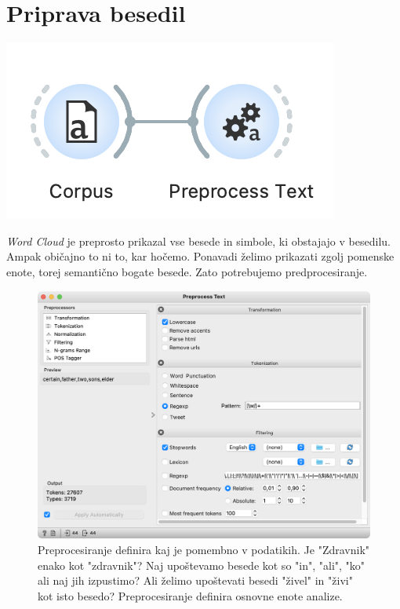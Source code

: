 \chapter{Priprava besedil}
\label{ch:priprava-besedil}

\begin{marginfigure}[2cm]
  \includegraphics[width=0.9\linewidth]{workflow.png}
  \caption{}
\end{marginfigure}

\textit{Word Cloud} je preprosto prikazal vse besede in simbole, ki obstajajo v besedilu. Ampak običajno to ni to, kar hočemo. Ponavadi želimo prikazati zgolj pomenske enote, torej semantično bogate besede. Zato potrebujemo predprocesiranje.

\begin{figure}[h]
  \includegraphics[width=\linewidth]{preprocess.png}%
  \caption{Preprocesiranje definira kaj je pomembno v podatikih. Je "Zdravnik" enako kot "zdravnik"? Naj upoštevamo besede kot so "in", "ali", "ko" ali naj jih izpustimo? Ali želimo upoštevati besedi "živel" in "živi" kot isto besedo? Preprocesiranje definira osnovne enote analize.}
  \label{fig:002-preprocess}
\end{figure}

